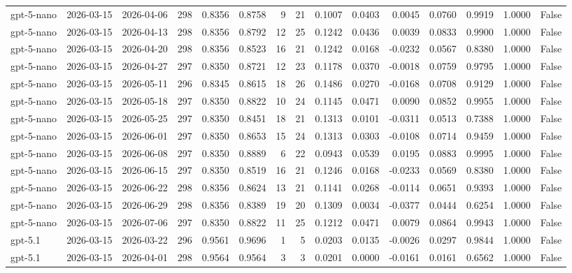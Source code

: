 \begin{table}
\begin{tabular}{lllrrrrrrrrrrrr}
gpt-5-nano & 2026-03-15 & 2026-04-06 & 298 & 0.8356 & 0.8758 & 9 & 21 & 0.1007 & 0.0403 & 0.0045 & 0.0760 & 0.9919 & 1.0000 & False \\
gpt-5-nano & 2026-03-15 & 2026-04-13 & 298 & 0.8356 & 0.8792 & 12 & 25 & 0.1242 & 0.0436 & 0.0039 & 0.0833 & 0.9900 & 1.0000 & False \\
gpt-5-nano & 2026-03-15 & 2026-04-20 & 298 & 0.8356 & 0.8523 & 16 & 21 & 0.1242 & 0.0168 & -0.0232 & 0.0567 & 0.8380 & 1.0000 & False \\
gpt-5-nano & 2026-03-15 & 2026-04-27 & 297 & 0.8350 & 0.8721 & 12 & 23 & 0.1178 & 0.0370 & -0.0018 & 0.0759 & 0.9795 & 1.0000 & False \\
gpt-5-nano & 2026-03-15 & 2026-05-11 & 296 & 0.8345 & 0.8615 & 18 & 26 & 0.1486 & 0.0270 & -0.0168 & 0.0708 & 0.9129 & 1.0000 & False \\
gpt-5-nano & 2026-03-15 & 2026-05-18 & 297 & 0.8350 & 0.8822 & 10 & 24 & 0.1145 & 0.0471 & 0.0090 & 0.0852 & 0.9955 & 1.0000 & False \\
gpt-5-nano & 2026-03-15 & 2026-05-25 & 297 & 0.8350 & 0.8451 & 18 & 21 & 0.1313 & 0.0101 & -0.0311 & 0.0513 & 0.7388 & 1.0000 & False \\
gpt-5-nano & 2026-03-15 & 2026-06-01 & 297 & 0.8350 & 0.8653 & 15 & 24 & 0.1313 & 0.0303 & -0.0108 & 0.0714 & 0.9459 & 1.0000 & False \\
gpt-5-nano & 2026-03-15 & 2026-06-08 & 297 & 0.8350 & 0.8889 & 6 & 22 & 0.0943 & 0.0539 & 0.0195 & 0.0883 & 0.9995 & 1.0000 & False \\
gpt-5-nano & 2026-03-15 & 2026-06-15 & 297 & 0.8350 & 0.8519 & 16 & 21 & 0.1246 & 0.0168 & -0.0233 & 0.0569 & 0.8380 & 1.0000 & False \\
gpt-5-nano & 2026-03-15 & 2026-06-22 & 298 & 0.8356 & 0.8624 & 13 & 21 & 0.1141 & 0.0268 & -0.0114 & 0.0651 & 0.9393 & 1.0000 & False \\
gpt-5-nano & 2026-03-15 & 2026-06-29 & 298 & 0.8356 & 0.8389 & 19 & 20 & 0.1309 & 0.0034 & -0.0377 & 0.0444 & 0.6254 & 1.0000 & False \\
gpt-5-nano & 2026-03-15 & 2026-07-06 & 297 & 0.8350 & 0.8822 & 11 & 25 & 0.1212 & 0.0471 & 0.0079 & 0.0864 & 0.9943 & 1.0000 & False \\
gpt-5.1 & 2026-03-15 & 2026-03-22 & 296 & 0.9561 & 0.9696 & 1 & 5 & 0.0203 & 0.0135 & -0.0026 & 0.0297 & 0.9844 & 1.0000 & False \\
gpt-5.1 & 2026-03-15 & 2026-04-01 & 298 & 0.9564 & 0.9564 & 3 & 3 & 0.0201 & 0.0000 & -0.0161 & 0.0161 & 0.6562 & 1.0000 & False \\

\end{tabular}
\end{table}
